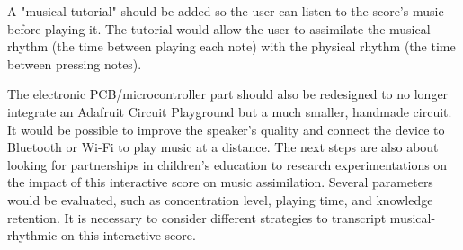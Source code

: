 A "musical tutorial" should be added so the user can listen to the score's music before playing it. The tutorial would allow the user to assimilate the musical rhythm (the time between playing each note) with the physical rhythm (the time between pressing notes).

The electronic PCB/microcontroller part should also be redesigned to no longer integrate an Adafruit Circuit Playground but a much smaller, handmade circuit. It would be possible to improve the speaker's quality and connect the device to Bluetooth or Wi-Fi to play music at a distance.
The next steps are also about looking for partnerships in children's education to research experimentations on the impact of this interactive score on music assimilation. Several parameters would be evaluated, such as concentration level, playing time, and knowledge retention. It is necessary to consider different strategies to transcript musical-rhythmic on this interactive score.
